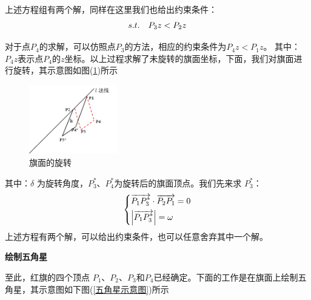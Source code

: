             上述方程组有两个解，同样在这里我们也给出约束条件：
            \begin{equation*}
            \centering
            s.t.\quad P_{3}z<P_{2}z
             \end{equation*}
             \par
             对于点$P_{4}$的求解，可以仿照点$P_{3}$的方法，相应的约束条件为$P_{4}z<P_{1}z$。
            其中：$P_{4}z$表示点$P_{4}$的$z$坐标。以上过程求解了未旋转的旗面坐标，下面，我们对旗面进行旋转，其示意图如图(\ref{fig:旗面的旋转})所示
            \begin{figure}[H]
            \centering
            \includegraphics[height=3cm]{images/9.jpg}
            \caption{旗面的旋转}
            \label{fig:旗面的旋转}
            \end{figure}
            \noindent 其中：$\delta$ 为旋转角度，$P_{3}^{*}$、$P_{4}^{*}$为旋转后的旗面顶点。我们先来求 $P_{3}^{*}$：
            \begin{equation*}
            \centering
            \left\{\begin{lgathered}
            \overrightarrow{P_1P_3^*}\cdot \overrightarrow{P_2P_1}=0\\
            \left|\overrightarrow{P_1P_3^*}\right|=\omega
             \end{lgathered} \right.
             \end{equation*}
            上述方程有两个解，可以给出约束条件，也可以任意舍弃其中一个解。
            \par
            \checkmark \textbf{绘制五角星}
            \par
            至此，红旗的四个顶点 $P_{1}、P_{2}、P_{3}$和$P_{4}$已经确定。下面的工作是在旗面上绘制五角星，其示意图如下图(\ref{五角星示意图})所示
